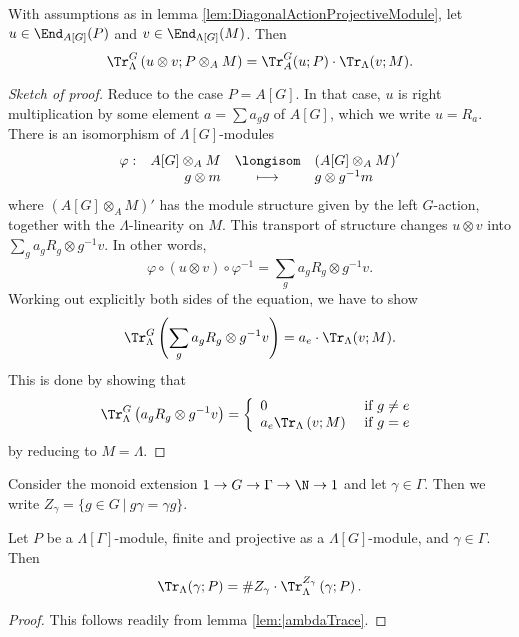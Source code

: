 \begin{lem} \label{lem:MultiplicativityOfTrace}
With assumptions as in lemma \ref{lem:DiagonalActionProjectiveModule}, let $u\in \End_{A[G]}(P)$ and $v\in \End_{\Lambda[G]}(M)$. Then
$$
\Tr_\Lambda^G \left(u\otimes v; P\otimes_A M\right) = \Tr_A^G(u; P)\cdot \Tr_\Lambda(v;M).
$$
\end{lem}

\begin{proof}[Sketch of proof] 
Reduce to the case $P=A[G]$. In that case, $u$ is right multiplication by some element $a = \sum a_gg$ of $A[G]$, which we write $u = R_a$. There is an isomorphism of $\Lambda[G]$-modules
$$
\begin{array}{rrcl}
\varphi: &A[G]\otimes_A M &\longisom &\left(A[G]\otimes_A M\right)'\\
&g\otimes m &\longmapsto & g\otimes g^{-1}m\end{array}
$$
where $\left(A[G]\otimes_A M\right)'$ has the module structure given by the left $G$-action, together with the $\Lambda$-linearity on $M$. This transport of structure changes $u \otimes v$ into $\sum_ga_gR_g\otimes g^{-1}v$. In other words,
$$
\varphi \circ (u \otimes v) \circ \varphi^{-1}
=
\sum_ga_gR_g\otimes g^{-1}v.
$$
Working out explicitly both sides of the equation, we have to show
$$
\Tr_\Lambda^G\left(\sum_g a_gR_g\otimes g^{-1}v\right) = a_e\cdot \Tr_\Lambda(v; M).
$$
This is done by showing that
$$\Tr_\Lambda^G\left(a_gR_g\otimes g^{-1}v\right) = \left\{\begin{array}{lc} 0 & \text{ if } g\neq e\\
a_e\Tr_\Lambda\left(v; M\right) & \text{ if }g=e\end{array}\right.$$
by reducing to $M=\Lambda$. 
\end{proof}

\begin{notation} 
Consider the monoid extension $1 \to G\to \Gamma\to \N \to 1$ and let $\gamma\in \Gamma$. Then we write $Z_\gamma = \{g\in G\ | \ g\gamma=\gamma g\}$.
\end{notation}

\begin{lem} \label{lem:GammaZGammaTrace}
Let $P$ be a $\Lambda[\Gamma]$-module, finite and projective as a $\Lambda[G]$-module, and $\gamma \in \Gamma$. Then
$$
\Tr_{\Lambda}(\gamma; P) = \# Z_\gamma \cdot \Tr_\Lambda^{Z_\gamma}\left(\gamma; P\right).
$$	
\end{lem}

\begin{proof} 
This follows readily from lemma \ref{lem:|ambdaTrace}. 
\end{proof}

